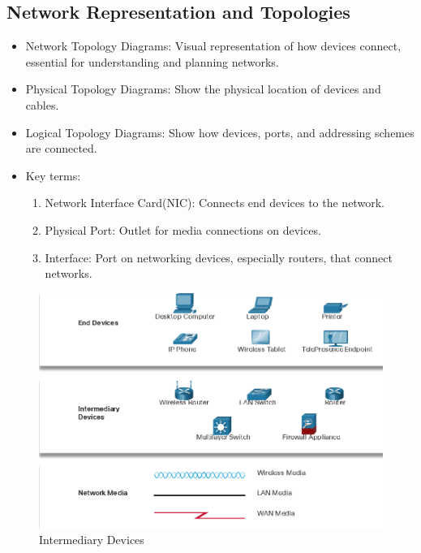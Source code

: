 \documentclass[a4paper,11pt]{article}
\begin{document}
\subsection{Network Representation and Topologies}

\begin{itemize}
    \item Network Topology Diagrams: Visual representation of how devices connect, essential for understanding and planning networks.\\
    \item Physical Topology Diagrams: Show the physical location of devices and cables.\\
    \item Logical Topology Diagrams: Show how devices, ports, and addressing schemes are connected.\\
    \item  Key terms:\\
    \begin{enumerate}
        \item Network Interface Card(NIC): Connects end devices to the network.\\
        \item Physical Port: Outlet for media connections on devices.\\
        \item Interface: Port on networking devices, especially routers, that connect networks.\\
    \end{enumerate}
\end{itemize}

\begin{figure}[h!]
    \centering
    \includegraphics[width=\textwidth]{2.png}
    \caption{Intermediary Devices}
    \label{fig:cap1}
\end{figure}
\end{document}
